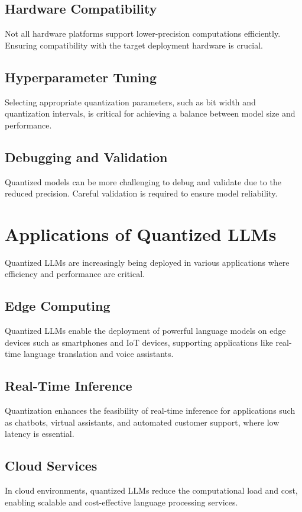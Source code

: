 \subsection{Hardware Compatibility}
Not all hardware platforms support lower-precision computations efficiently. Ensuring compatibility with the target deployment hardware is crucial.

\subsection{Hyperparameter Tuning}
Selecting appropriate quantization parameters, such as bit width and quantization intervals, is critical for achieving a balance between model size and performance.

\subsection{Debugging and Validation}
Quantized models can be more challenging to debug and validate due to the reduced precision. Careful validation is required to ensure model reliability.

\section{Applications of Quantized LLMs}
Quantized LLMs are increasingly being deployed in various applications where efficiency and performance are critical.

\subsection{Edge Computing}
Quantized LLMs enable the deployment of powerful language models on edge devices such as smartphones and IoT devices, supporting applications like real-time language translation and voice assistants.

\subsection{Real-Time Inference}
Quantization enhances the feasibility of real-time inference for applications such as chatbots, virtual assistants, and automated customer support, where low latency is essential.

\subsection{Cloud Services}
In cloud environments, quantized LLMs reduce the computational load and cost, enabling scalable and cost-effective language processing services.

